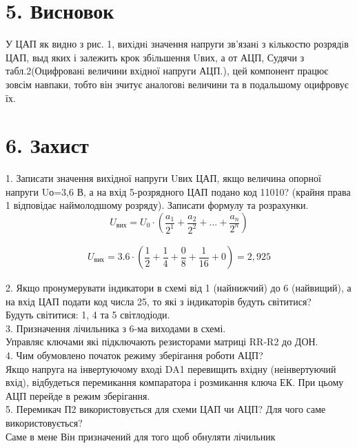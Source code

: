 \documentclass[14pt]{extreport}
\begin{document}



\newpage

\section*{\textrm{5. Висновок}}
  У ЦАП як видно з рис. 1,
вихiднi значення напруги зв’язанi з кiлькостю розрядiв ЦАП, выд яких і залежить крок збiльшення Uвих, а от  АЦП, Судячи з табл.2(Оцифрованi величини вхiдної напруги АЦП.), цей компонент працює зовсім навпаки, тобто він зчитує аналоговi величини та в подальшому оцифровує їх.

\clearpage
\section*{\textrm{6. Захист}}
1. Записати значення вихідної напруги Uвих ЦАП, якщо величина опорної
напруги Uо=3,6 В, а на вхід 5-розрядного ЦАП подано код 11010? (крайня
права 1 відповідає наймолодшому розряду). Записати формулу та
розрахунки.\\ 
\[ U_{\text{вих}}  = U_0\cdot(\dfrac{a_1}{2^1} + \dfrac{a_2}{2^2} +...+ \dfrac{a_n}{2^n}) \]

\begin{align*}
U_{\text{вих}}  = 3.6\cdot (\dfrac{1}{2}  +\dfrac{1}{4} +\dfrac{0}{8}  +\dfrac{1}{16}  +  0) = 2,925
\end{align*}

2. Якщо пронумерувати індикатори в схемі від 1 (найнижчий) до 6
(найвищий), а на вхід ЦАП подати код числа 25, то які з індикаторів будуть
світитися? \\
Будуть світитися:  1, 4 та 5 світлодіоди.\\

3. Призначення лічильника з 6-ма виходами в схемі.\\ 
Управляє ключами які підключають резисторами матриці RR-R2 до ДОН.\\ 

4. Чим обумовлено початок режиму зберігання роботи АЦП?\\ 
Якщо напруга на інвертуючому вході DA1 перевищить вхідну (неінвертуючий вхід), відбудеться перемикання компаратора і розмикання ключа ЕК. При цьому АЦП перейде в режим зберігання. \\ 

5. Перемикач П2 використовується для схеми ЦАП чи АЦП? Для чого саме
використовується?\\ 
Саме в мене Він призначений для того щоб обнуляти лічильник

 
\end{document}
